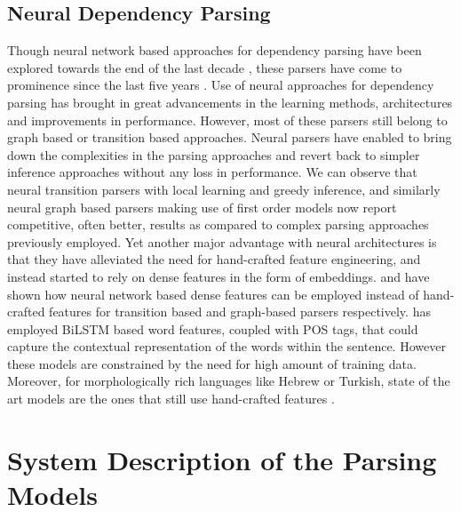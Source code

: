 \documentclass[11pt]{article}
\begin{document}





\subsection{Neural Dependency Parsing}

Though neural network based approaches for dependency parsing have been explored towards the end of the last decade \cite{titov-henderson-2007-latent,Attardi+al-2009}, these parsers have come to prominence since the last five years \cite{kulmizev-etal-2019-deep}. Use of neural approaches for dependency parsing has brought in great advancements in the learning methods, architectures and improvements in performance. However, most of these parsers still belong to graph based or transition based approaches. Neural parsers have enabled to bring down the complexities in the parsing approaches and revert back to simpler inference approaches without any loss in performance. We can observe that neural transition parsers with local learning and greedy inference, and similarly neural graph based parsers making use of first order models now report competitive, often better, results as compared to complex parsing approaches previously employed. Yet another major advantage with neural architectures is that they  have alleviated the need for hand-crafted feature engineering, and instead started to rely on dense features in the form of embeddings.  and  have shown how neural network based dense features can be employed instead of hand-crafted features for transition based and graph-based parsers respectively.  has employed BiLSTM based word features, coupled with POS tags, that could capture the contextual representation of the words within the sentence. However these models are constrained by the need for high amount of training data. Moreover, for morphologically rich languages like Hebrew or Turkish, state of the art models are the ones that still use hand-crafted features \cite{more-etal-2019-joint,seeker-cetinoglu-2015-graph}. 



\section{System Description of the Parsing Models}
\end{document}
